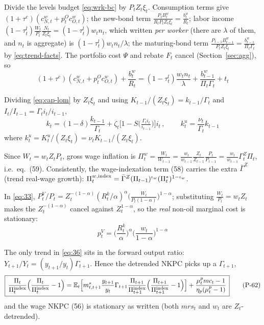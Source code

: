 Divide the levels budget \eqref{eq:wrk-bc} by $P_tZ_t\xi_t$. Consumption terms give
$(1+\tau^c)(c^w_{N,t}+p^O_tc^w_{O,t})$; the new-bond term $\tfrac{P_tB^w_t}{R_tP_tZ_t\xi_t}=\tfrac{b^w_t}{R_t}$;
labor income $(1-\tau^l_t)\tfrac{W_t}{P_t}\tfrac{N_t}{Z_t\xi_t}=(1-\tau^l_t)w_tn_t$, which written
\emph{per worker} (there are $\lambda$ of them, and $n_t$ is aggregate) is $(1-\tau^l_t)w_tn_t/\lambda$;
the maturing-bond term $\tfrac{P_{t-1}B^w_{t-1}}{P_tZ_t\xi_t}=\tfrac{b^w_{t-1}}{\Pi_t\Gamma_t}$ by
\eqref{eq:trend-facts}. The portfolio cost $\Psi$ and rebate $F_t$ cancel (Section~\ref{sec:agg}), so
\begin{equation}\label{eq:46d}
\boxed{\,(1+\tau^c)(c^w_{N,t}+p^O_tc^w_{O,t})+\frac{b^w_t}{R_t}
=(1-\tau^l_t)\frac{w_tn_t}{\lambda}+\frac{b^w_{t-1}}{\Pi_t\Gamma_t}+t_t\,}\tag{P-46}
\end{equation}

Dividing \eqref{eq:cap-lom} by $Z_t\xi_t$ and using $K_{t-1}/(Z_t\xi_t)=k_{t-1}/\Gamma_t$ and
$I_t/I_{t-1}=\Gamma_t i_t/i_{t-1}$,
\begin{equation}\label{eq:60d}
\boxed{\,k_t=(1-\delta)\frac{k_{t-1}}{\Gamma_t}+\zeta_t\Big[1-S\big(\tfrac{\Gamma_ti_t}{i_{t-1}}\big)\Big]i_t\,},
\qquad
\boxed{\,k^u_t=\frac{\nu_t}{\Gamma_t}k_{t-1}\,}\tag{P-60/61}
\end{equation}
where $k^u_t=K^u_t/(Z_t\xi_t)=\nu_tK_{t-1}/(Z_t\xi_t)$.

Since $W_t=w_tZ_tP_t$, gross wage inflation is
$\Pi^w_t=\tfrac{W_t}{W_{t-1}}=\tfrac{w_t}{w_{t-1}}\tfrac{Z_t}{Z_{t-1}}\tfrac{P_t}{P_{t-1}}
=\tfrac{w_t}{w_{t-1}}\Gamma^Z_t\Pi_t$, i.e.\ eq.\ (59). Consistently, the wage-indexation term (58)
carries the extra $\bar\Gamma^Z$ (trend real-wage growth):
$\Pi^{w,\text{index}}_t=\bar\Gamma^Z(\Pi_{t-1})^{\iota_w}(\Pi^*_t)^{1-\iota_w}$.

In \eqref{eq:33}, $P^V_t/P_t=Z_t^{-(1-\alpha)}(R^k_t/\alpha)^\alpha\big(\tfrac{W_t}{P_t(1-\alpha)}\big)^{1-\alpha}$;
substituting $\tfrac{W_t}{P_t}=w_tZ_t$ makes the $Z_t^{-(1-\alpha)}$ cancel against $Z_t^{1-\alpha}$, so
the \emph{real} non-oil marginal cost is stationary:
\begin{equation}\label{eq:64d}
\boxed{\,p^V_t=\Big(\frac{R^k_t}{\alpha}\Big)^\alpha\Big(\frac{w_t}{1-\alpha}\Big)^{1-\alpha}\,}\tag{P-64}
\end{equation}

The only trend in \eqref{eq:36} sits in the forward output ratio: $Y_{t+1}/Y_t=(y_{t+1}/y_t)\Gamma_{t+1}$.
Hence the detrended NKPC picks up a $\Gamma_{t+1}$,
\begin{equation}\label{eq:62d}
\boxed{\,\frac{\Pi_t}{\Pi^{\text{index}}_t}\Big(\frac{\Pi_t}{\Pi^{\text{index}}_t}-1\Big)
=\mathbb{E}_t\Big[m^s_{t,t+1}\frac{y_{t+1}}{y_t}\Gamma_{t+1}\frac{\Pi_{t+1}}{\Pi^{\text{index}}_{t+1}}\Big(\frac{\Pi_{t+1}}{\Pi^{\text{index}}_{t+1}}-1\Big)\Big]
+\frac{\mu^p_tmc_t-1}{\eta_p(\mu^p_t-1)}\,}\tag{P-62}
\end{equation}
and the wage NKPC (56) is stationary as written (both $mrs_t$ and $w_t$ are $Z_t$-detrended).

